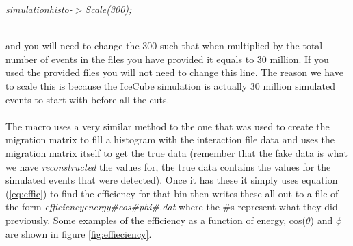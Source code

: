 \documentclass[12pt]{article}
\numberwithin{equation}{section}
\numberwithin{figure}{section}
\begin{document}
\centerline{\emph{simulation\textunderscore histo-$>$Scale(300);}}\\
and you will need to change the 300 such that when multiplied by the total number of events in the files you have provided it equals to 30 million. If you used the provided files you will not need to change this line. The reason we have to scale this is because the IceCube simulation is actually 30 million simulated events to start with before all the cuts.\\
\\
The macro uses a very similar method to the one that was used to create the migration matrix to fill a histogram with the interaction file data and uses the migration matrix itself to get the true data (remember that the fake data is what we have \emph{reconstructed} the values for, the true data contains the values for the simulated events that were detected). Once it has these it simply uses equation (\ref{eq:effic}) to find the efficiency for that bin then writes these all out to a file of the form \emph{efficiency\textunderscore energy\textunderscore \#\textunderscore cos\textunderscore \#\textunderscore phi\textunderscore\#.dat} where the $\#$s represent what they did previously. Some examples of the efficiency as a function of energy, cos($\theta$) and $\phi$ are shown in figure \ref{fig:effieciency}.
\end{document}
